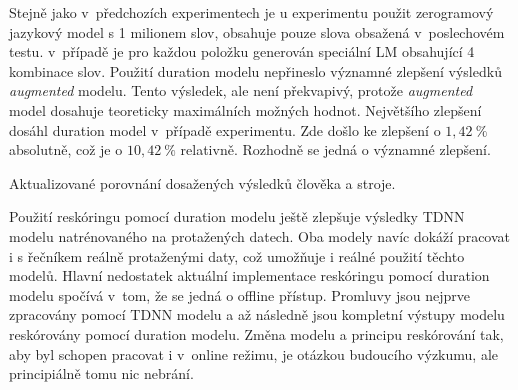 Stejně jako v~předchozích experimentech je u  experimentu použit zerogramový jazykový model s 1 milionem slov,  obsahuje pouze slova obsažená v~poslechovém testu. v~případě  je pro každou položku generován speciální LM obsahující 4 kombinace slov. Použití duration modelu nepřineslo významné zlepšení výsledků \textit{augmented} modelu. Tento výsledek, ale není překvapivý, protože \textit{augmented} model dosahuje teoreticky maximálních možných hodnot. Největšího zlepšení dosáhl duration model v~případě  experimentu. Zde došlo ke zlepšení o $1,42\ \%$ absolutně, což je o $10,42\ \%$ relativně. Rozhodně se jedná o významné zlepšení.

\begin{table}[htpb]
  \centering
  \def\arraystretch{1.5}
  \caption{Aktualizované porovnání dosažených výsledků člověka a stroje.}
  \label{tab:realisation:duration:comparison}
\end{table}

Použití reskóringu pomocí duration modelu ještě zlepšuje výsledky TDNN modelu natrénovaného na protažených datech. Oba modely navíc dokáží pracovat i s řečníkem reálně protaženými daty, což umožňuje i reálné použití těchto modelů. Hlavní nedostatek aktuální implementace reskóringu pomocí duration modelu spočívá v~tom, že se jedná o offline přístup. Promluvy jsou nejprve zpracovány pomocí TDNN modelu a až následně jsou kompletní výstupy modelu reskórovány pomocí duration modelu. Změna modelu a principu reskórování tak, aby byl schopen pracovat i v~online režimu, je otázkou budoucího výzkumu, ale principiálně tomu nic nebrání.
